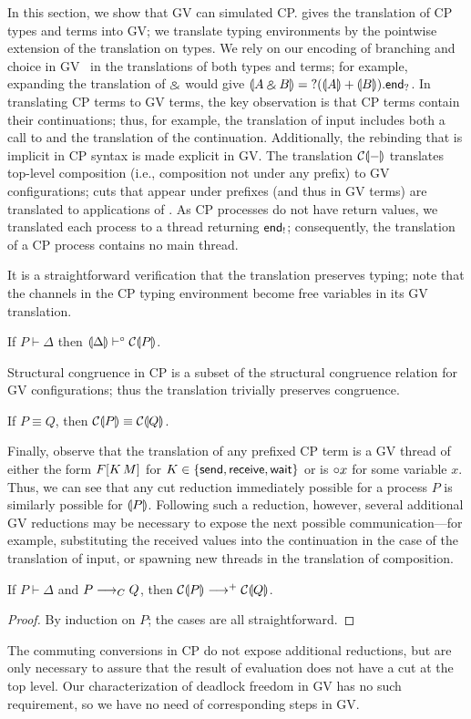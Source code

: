 \documentclass[oribibl,orivec,envcountsame]{llncs}
\begin{document}
In this section, we show that GV can simulated CP.  gives the translation of CP
types and terms into GV; we translate typing environments by the pointwise extension of the
translation on types. We rely on our encoding of branching and choice in GV~ in
the translations of both types and terms; for example, expanding the translation of $\mathbin\binampersand$ would
give $\llparenthesis A \mathbin\binampersand B \rrparenthesis = {?(\llparenthesis A \rrparenthesis + \llparenthesis B \rrparenthesis).\mathsf{end}_?}$. In translating CP terms to GV
terms, the key observation is that CP terms contain their continuations; thus, for example, the
translation of input includes both a call to  and the translation of the
continuation.  Additionally, the rebinding that is implicit in CP syntax is made explicit in GV.
The translation $\mathcal{C}\llparenthesis - \rrparenthesis$ translates top-level composition (i.e., composition not under any
prefix) to GV configurations; cuts that appear under prefixes (and thus in GV terms) are translated
to applications of .  As CP processes do not have return values, we translated each
process to a thread returning $\mathsf{end}_!$; consequently, the translation of a CP process contains no
main thread.

It is a straightforward verification that the translation preserves typing; note that the channels
in the CP typing environment become free variables in its GV translation.
%
\begin{theorem}
If $P \vdash \Delta$ then $\llparenthesis \Delta \rrparenthesis \vdash^{\mathord{\circ}} \mathcal{C}\llparenthesis P \rrparenthesis$.
\end{theorem}
%
Structural congruence in CP is a subset of the structural congruence relation for GV configurations;
thus the translation trivially preserves congruence.
%
\begin{theorem}
If $P \equiv Q$, then $\mathcal{C}\llparenthesis P \rrparenthesis \equiv \mathcal{C}\llparenthesis Q \rrparenthesis$.
\end{theorem}
%
Finally, observe that the translation of any prefixed CP term is a GV thread of either the form $F[K
\, M]$ for $K \in \{ \mathsf{send}, \mathsf{receive}, \mathsf{wait} \}$ or is ${\mathord{\circ}} x$ for
some variable $x$.  Thus, we can see that any cut reduction immediately possible for a process $P$
is similarly possible for $\llparenthesis P \rrparenthesis$.  Following such a reduction, however, several additional GV
reductions may be necessary to expose the next possible communication---for example, substituting
the received values into the continuation in the case of the translation of input, or spawning new
threads in the translation of composition.
%
\begin{theorem}\label{thm:cp-reduction-simulated}
If $P \vdash \Delta$ and $P \longrightarrow_C Q$, then $\mathcal{C}\llparenthesis P \rrparenthesis \longrightarrow^+ \mathcal{C}\llparenthesis Q \rrparenthesis$.
\end{theorem}
%
\begin{proof}
  By induction on $P$; the cases are all straightforward.
\end{proof}
%
The commuting conversions in CP do not expose additional reductions, but are only necessary to
assure that the result of evaluation does not have a cut at the top level.  Our characterization of
deadlock freedom in GV has no such requirement, so we have no need of corresponding steps in GV.
\end{document}
